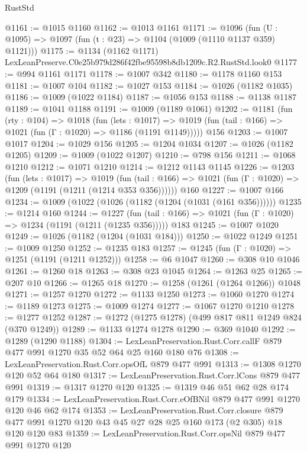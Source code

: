 \begin{lexlean}{RustStd}
\begin{coremodule}
@1161 := @1015 @1160
@1162 := @1013 @1161
@1171 := @1096 (fun (U : @1095) => @1097 (fun (t : @23) => @1104 (@1009 (@1110 @1137 @359) @1121)))
@1175 := @1134 (@1162 @1171) LexLeanPreserve.C0e25b979d286f42fbe95598b8db1209c.R2.RustStd.look0
@1177 := @994 @1161 @1171
@1178 := @1007 @342
@1180 := @1178 @1160 @153
@1181 := @1007 @104
@1182 := @1027 @153
@1184 := @1026 (@1182 @1035)
@1186 := @1009 (@1022 @1184)
@1187 := @1056 @153
@1188 := @1138 @1187
@1189 := @1041 @1188
@1191 := @1009 (@1189 @1061)
@1202 := @1181
    (fun (rty : @104) =>
    @1018
      (fun (lets : @1017) =>
      @1019 (fun (tail : @166) => @1021 (fun (Γ : @1020) => @1186 (@1191 @1149)))))
    @156
@1203 := @1007 @1017
@1204 := @1029 @156
@1205 := @1204 @1034
@1207 := @1026 (@1182 @1205)
@1209 := @1009 (@1022 @1207)
@1210 := @798 @156
@1211 := @1068 @1210
@1212 := @1071 @1210
@1214 := @1212 @1143 @1145
@1226 := @1203
    (fun (lets : @1017) =>
    @1019 (fun (tail : @166) => @1021 (fun (Γ : @1020) => @1209 (@1191 (@1211 (@1214 @353 @356))))))
    @160
@1227 := @1007 @166
@1234 := @1009 (@1022 (@1026 (@1182 (@1204 (@1031 (@161 @356))))))
@1235 := @1214 @160
@1244 := @1227
    (fun (tail : @166) => @1021 (fun (Γ : @1020) => @1234 (@1191 (@1211 (@1235 @356)))))
    @183
@1245 := @1007 @1020
@1249 := @1026 (@1182 (@1204 (@1031 @184)))
@1250 := @1022 @1249
@1251 := @1009 @1250
@1252 := @1235 @183
@1257 := @1245 (fun (Γ : @1020) => @1251 (@1191 (@1211 @1252)))
@1258 := @6 @1047
@1260 := @308 @10 @1046
@1261 := @1260 @18
@1263 := @308 @23 @1045
@1264 := @1263 @25
@1265 := @207 @10
@1266 := @1265 @18
@1270 := @1258 (@1261 (@1264 @1266)) @1048
@1271 := @1257 @1270
@1272 := @1133 @1250
@1273 := @1060 @1270
@1274 := @1189 @1273
@1275 := @1009 @1274
@1277 := @1067 @1270 @1210
@1278 := @1277 @1252
@1287 := @1272 (@1275 @1278) (@499 @817 @811 @1249 @824 (@370 @1249))
@1289 := @1133 @1274 @1278
@1290 := @369 @1040
@1292 := @1289 (@1290 @1188)
@1304 := LexLeanPreservation.Rust.Corr.callF @879 @477 @991 @1270 @35 @52 @64 @25 @160 @180 @76
@1308 := LexLeanPreservation.Rust.Corr.opsOfL @879 @477 @991
@1313 := @1308 @1270 @120 @52 @64 @180
@1317 := LexLeanPreservation.Rust.Corr.lCons @879 @477 @991
@1319 := @1317 @1270 @120
@1325 := @1319 @46 @51 @62 @28 @174 @179
@1334 := LexLeanPreservation.Rust.Corr.eOfBNil @879 @477 @991 @1270 @120 @46 @62 @174
@1353 := LexLeanPreservation.Rust.Corr.closure
    @879
    @477
    @991
    @1270
    @120
    @43
    @45
    @27
    @28
    @25
    @160
    @173
    (@2 @305)
    @18
    @120
    @120
    @83
@1359 := LexLeanPreservation.Rust.Corr.opsNil @879 @477 @991 @1270 @120

\end{coremodule}
\end{lexlean}
